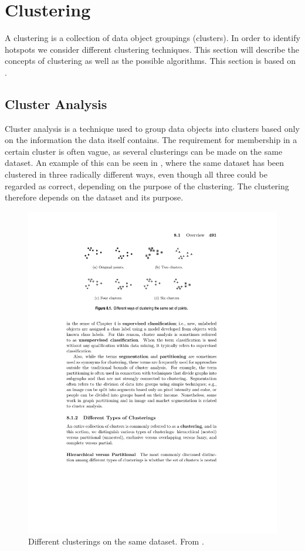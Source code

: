 \section{Clustering}\label{clustering}
A clustering is a collection of data object groupings (clusters).
In order to identify hotspots we consider different clustering techniques.
This section will describe the concepts of clustering as well as the possible algorithms.
This section is based on \citet{pang2006introduction}.

\subsection{Cluster Analysis}
Cluster analysis is a technique used to group data objects into clusters based only on the information the data itself contains.
The requirement for membership in a certain cluster is often vague, as several clusterings can be made on the same dataset.
An example of this can be seen in , where the same dataset has been clustered in three radically different ways, even though all three could be regarded as correct, depending on the purpose of the clustering.
The clustering therefore depends on the dataset and its purpose.

\begin{figure}[H]
\includegraphics[trim= 3.1cm 19.91cm 5cm 2.5cm, clip=true]{graphics/different_clusters}
\centering
\caption{Different clusterings on the same dataset. From \citet{pang2006introduction}.}
\label{clusterings}
\end{figure}


